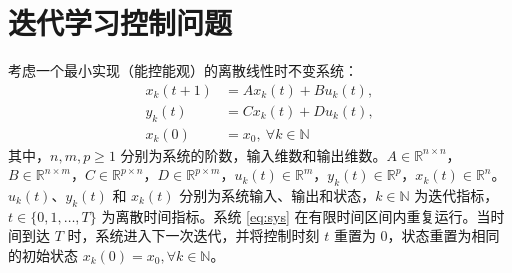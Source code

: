 \section{迭代学习控制问题}

考虑一个最小实现（能控能观）的离散线性时不变系统：
\begin{equation}
	\begin{aligned}
		x_k(t+1) &= A x_k(t) + B u_k(t), \\
		y_k(t) &= C x_k(t) + D u_k(t),\\
		x_k(0) &= x_0, \ \forall k\in\mathbb{N}
	\end{aligned}
	\label{eq:sys}
\end{equation}
其中，$n, m, p \geq 1$ 分别为系统的阶数，输入维数和输出维数。$A \in \mathbb{R}^{n \times n}$，$B \in \mathbb{R}^{n \times m}$，$C \in \mathbb{R}^{p \times n}$，$D \in \mathbb{R}^{p \times m}$，\(u_k(t)\in\mathbb{R}^m\)，\(y_k(t)\in\mathbb{R}^p\)，\(x_k(t)\in\mathbb{R}^n\)。$u_k(t)$、$y_k(t)$ 和 $x_k(t)$ 分别为系统输入、输出和状态，$k \in \mathbb{N}$ 为迭代指标，$t \in \{0, 1, \dots, T\}$ 为离散时间指标。系统 \eqref{eq:sys} 在有限时间区间内重复运行。当时间到达 $T$ 时，系统进入下一次迭代，并将控制时刻 $t$ 重置为 0，状态重置为相同的初始状态 $x_k(0) = x_0, \forall k \in \mathbb{N}$。

